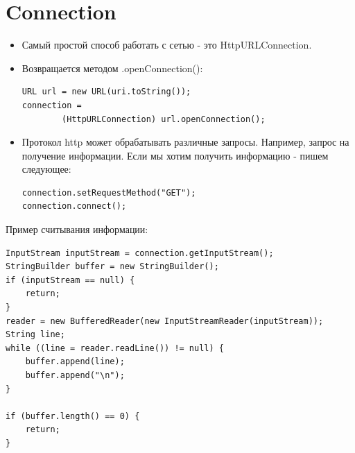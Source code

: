 \documentclass[12 pt]{article}
\begin{document}
\section{Connection}
    \begin{itemize}
        \item Самый простой способ работать с сетью - это HttpURLConnection.
        \item Возвращается методом .openConnection():
        \begin{lstlisting}
URL url = new URL(uri.toString());
connection = 
        (HttpURLConnection) url.openConnection();
        \end{lstlisting}
        \item Протокол http может обрабатывать различные запросы. Например, запрос на получение информации. Если мы хотим получить информацию - пишем следующее:
        \begin{lstlisting}
connection.setRequestMethod("GET");
connection.connect();
        \end{lstlisting}
    \end{itemize}
    Пример считывания информации:
    \begin{lstlisting}
InputStream inputStream = connection.getInputStream();
StringBuilder buffer = new StringBuilder();
if (inputStream == null) {
    return;
}
reader = new BufferedReader(new InputStreamReader(inputStream));
String line;
while ((line = reader.readLine()) != null) {
    buffer.append(line);
    buffer.append("\n");
}

if (buffer.length() == 0) {
    return;
}
    \end{lstlisting}
\end{document}
